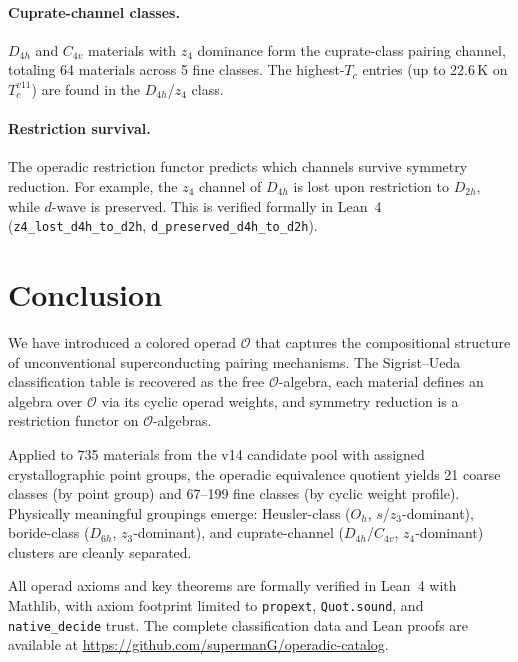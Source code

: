 \documentclass[11pt,a4paper]{article}
\newcommand{\OO}{\mathcal{O}}
\begin{document}
\paragraph{Cuprate-channel classes.}
$D_{4h}$ and $C_{4v}$ materials with $z_4$ dominance form the
cuprate-class pairing channel, totaling 64 materials across 5
fine classes. The highest-$T_c$ entries (up to 22.6\,K on $T_c^{v11}$)
are found in the $D_{4h}$/$z_4$ class.

\paragraph{Restriction survival.}
The operadic restriction functor predicts which channels survive
symmetry reduction. For example, the $z_4$ channel of $D_{4h}$
is lost upon restriction to $D_{2h}$, while $d$-wave is
preserved. This is verified formally in Lean~4 (\texttt{z4\_lost\_d4h\_to\_d2h}, \texttt{d\_preserved\_d4h\_to\_d2h}).

\section{Conclusion}\label{sec:conclusion}

We have introduced a colored operad $\OO$ that captures the
compositional structure of unconventional superconducting pairing
mechanisms. The Sigrist--Ueda classification table is recovered as
the free $\OO$-algebra, each material defines an algebra over $\OO$
via its cyclic operad weights, and symmetry reduction is a
restriction functor on $\OO$-algebras.

Applied to 735 materials from the v14 candidate pool with assigned
crystallographic point groups, the operadic equivalence quotient
yields 21 coarse classes (by point group) and 67--199 fine classes
(by cyclic weight profile). Physically meaningful groupings emerge:
Heusler-class ($O_h$, $s$/$z_3$-dominant), boride-class ($D_{6h}$,
$z_3$-dominant), and cuprate-channel ($D_{4h}$/$C_{4v}$,
$z_4$-dominant) clusters are cleanly separated.

All operad axioms and key theorems are formally verified in
Lean~4 with Mathlib, with axiom footprint limited to
\texttt{propext}, \texttt{Quot.sound}, and \texttt{native\_decide}
trust. The complete classification data and Lean proofs are
available at \url{https://github.com/supermanG/operadic-catalog}.



\end{document}
